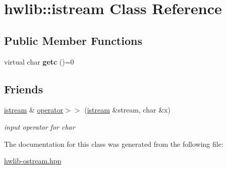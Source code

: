 \hypertarget{classhwlib_1_1istream}{}\section{hwlib\+:\+:istream Class Reference}
\label{classhwlib_1_1istream}
\subsection*{Public Member Functions}
\begin{DoxyCompactItemize}
\item 
virtual char {\bfseries getc} ()=0\hypertarget{classhwlib_1_1istream_a9a260f800b08d4788b9e399f65d1c728}{}\label{classhwlib_1_1istream_a9a260f800b08d4788b9e399f65d1c728}

\end{DoxyCompactItemize}
\subsection*{Friends}
\begin{DoxyCompactItemize}
\item 
\hyperlink{classhwlib_1_1istream}{istream} \& \hyperlink{classhwlib_1_1istream_a88dabf0f321a5f098ede5ee108d0a92b}{operator$>$$>$} (\hyperlink{classhwlib_1_1istream}{istream} \&stream, char \&x)\hypertarget{classhwlib_1_1istream_a88dabf0f321a5f098ede5ee108d0a92b}{}\label{classhwlib_1_1istream_a88dabf0f321a5f098ede5ee108d0a92b}

\begin{DoxyCompactList}\small\item\em input operator for char \end{DoxyCompactList}\end{DoxyCompactItemize}


The documentation for this class was generated from the following file\+:\begin{DoxyCompactItemize}
\item 
\hyperlink{hwlib-ostream_8hpp}{hwlib-\/ostream.\+hpp}\end{DoxyCompactItemize}
